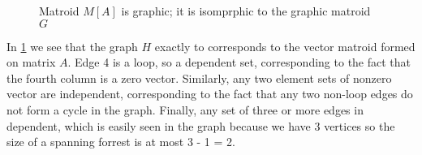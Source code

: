  
\begin{figure}[H]
    \centering
    \qquad
    \caption{Matroid $M[A]$ is graphic; it is isomprphic to the graphic matroid $G$}%
    \label{graphic}%
\end{figure}

In \ref{graphic} we see that the graph $H$ exactly to corresponds to the vector matroid formed on matrix $A$. Edge 4 is a loop, so a dependent set, corresponding to the fact that the fourth column is a zero vector. Similarly, any two element sets of nonzero vector are independent, corresponding to the fact that any two non-loop edges do not form a cycle in the graph. Finally, any set of three or more edges in dependent, which is easily seen in the graph because we have 3 vertices so the size of a spanning forrest is at most 3 - 1 = 2.


